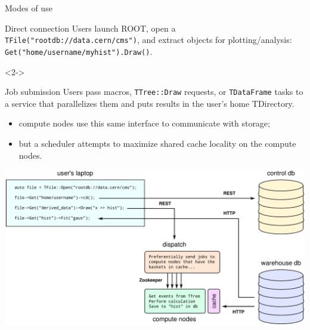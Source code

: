 \documentclass[aspectratio=169]{beamer}
\begin{document}
\begin{frame}{Modes of use}
\vspace{0.5 cm}
\begin{block}{Direct connection}
Users launch ROOT, open a {\tt TFile("rootdb://data.cern/cms")}, and extract objects for plotting/analysis: {\tt Get("home/username/myhist").Draw()}.
\end{block}

\vspace{0.5 cm}
\begin{uncoverenv}<2->
\begin{block}{Job submission}
Users pass macros, {\tt TTree::Draw} requests, or {\tt TDataFrame} tasks to a service that parallelizes them and puts results in the user's home TDirectory.

\begin{itemize}
\item<3-> compute nodes use this same interface to communicate with storage;
\item<4-> but a scheduler attempts to maximize shared cache locality on the compute nodes.
\end{itemize}
\end{block}
\end{uncoverenv}

\vspace{0.25 cm}
\begin{center}
\large {}
\end{center}
\end{frame}

\begin{frame}{}
\vspace{1.25 cm}
\includegraphics[width=\linewidth]{root-query-system.pdf}
\end{frame}
\end{document}
